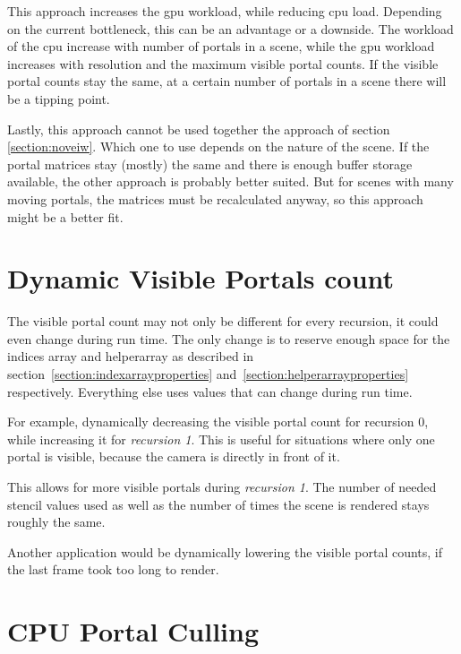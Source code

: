 This approach increases the \gls{gpu} workload, while reducing \gls{cpu} load. Depending on the current bottleneck, this can be an advantage or a downside. The workload of the \gls{cpu} increase with number of portals in a scene, while the \gls{gpu} workload increases with resolution and the maximum visible portal counts. If the visible portal counts stay the same, at a certain number of portals in a scene there will be a tipping point.

Lastly, this approach cannot be used together the approach of section \ref{section:noveiw}. Which one to use depends on the nature of the scene. If the portal matrices stay (mostly) the same and there is enough buffer storage available, the other approach is probably better suited. But for scenes with many moving portals, the matrices must be recalculated anyway, so this approach might be a better fit. 


\section{Dynamic Visible Portals count}
The visible portal count may not only be different for every recursion, it could even change during run time. The only change is to reserve enough space for the indices array and \gls{helperarray} as described in section~\ref{section:indexarrayproperties} and~\ref{section:helperarrayproperties} respectively. Everything else uses values that can change during run time.

For example, dynamically decreasing the visible portal count for recursion 0, while increasing it for \textit{recursion 1}. This is useful for situations where only one portal is visible, because the camera is directly in front of it.

This allows for more visible portals during \textit{recursion 1}. The number of needed stencil values used as well as the number of times the scene is rendered stays roughly the same.

Another application would be dynamically lowering the visible portal counts, if the last frame took too long to render.

\section{CPU Portal Culling}
\label{section:cullingportals}

